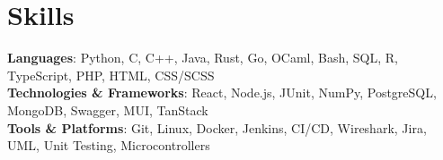 \documentclass[letterpaper,11pt]{article}
\begin{document}
\section{Skills}
 \begin{itemize}[leftmargin=0.15in, label={}]
    \small{\item{
     \textbf{Languages}{: Python, C, C++, Java, Rust, Go, OCaml, Bash, SQL, R, TypeScript, PHP, HTML, CSS/SCSS} \\
     \textbf{Technologies \& Frameworks}{: React, Node.js, JUnit, NumPy, PostgreSQL, MongoDB, Swagger, MUI, TanStack} \\
     \textbf{Tools \& Platforms}{: Git, Linux, Docker, Jenkins, CI/CD, Wireshark, Jira, UML, Unit Testing, Microcontrollers}
    }}
 \end{itemize}

\end{document}
